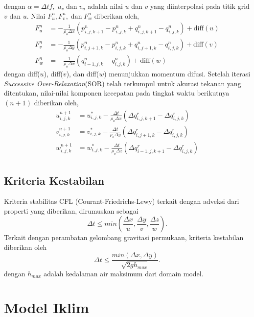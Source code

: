 \begin{spacing}{1.5}
\begin{equation}
	\end{equation}
	dengan $\alpha = \Delta tf, \; u_v \;\text{dan}\;v_u$ adalah nilai $u$ dan $v$ yang diinterpolasi pada titik grid $v$ dan $u$. Nilai $F_{u}^{n}, F_{v}^{n},\;\text{dan}\;F_{w}^{n}$ diberikan oleh,
	\begin{equation}
		\begin{aligned}
			F_{u}^{n} &=-\frac{1}{\rho_o \Delta x}(p_{i,j,k+1}^{n}-p_{i,j,k}^{n}+q_{i,j,k+1}^{n}-q_{i,j,k}^{n})+\text{diff}(u)\\
			F_{v}^{n} &=-\frac{1}{\rho_o \Delta y}(p_{i,j+1,k}^{n}-p_{i,j,k}^{n}+q_{i,j+1,k}^{n}-q_{i,j,k}^{n})+\text{diff}(v)\\
			F_{w}^{n} &=-\frac{1}{\rho_o \Delta x}(q_{i-1,j,k}^{n}-q_{i,j,k}^{n})+\text{diff}(w)
		\end{aligned}
	\end{equation}
	dengan diff($u$), diff($v$), dan diff($w$) menunjukkan momentum difusi. Setelah iterasi \textit{Successive Over-Relaxation}(SOR) telah terkumpul untuk akurasi tekanan yang ditentukan, nilai-nilai komponen kecepatan pada tingkat waktu berikutnya $(n+1)$ diberikan oleh,
	\begin{equation}
		\begin{aligned}
			u_{i,j,k}^{n+1} &= u_{i,j,k}^{*}-\frac{\Delta t}{\rho_o \Delta x}(\Delta q_{i,j,k+1}^{r} - \Delta q_{i,j,k}^{r})\\
			v_{i,j,k}^{n+1} &= v_{i,j,k}^{*}-\frac{\Delta t}{\rho_o \Delta y}(\Delta q_{i,j+1,k}^{r} - \Delta q_{i,j,k}^{r})\\
			w_{i,j,k}^{n+1} &= w_{i,j,k}^{*}-\frac{\Delta t}{\rho_o \Delta z}(\Delta q_{i-1,j,k+1}^{r} - \Delta q_{i,j,k}^{r})\\
		\end{aligned}
	\end{equation}
\subsection[Kriteria Kestabilan]{Kriteria Kestabilan}
	Kriteria stabilitas CFL (Courant-Friedrichs-Lewy) terkait dengan adveksi dari properti yang diberikan, dirumuskan sebagai
	\begin{equation}
		\Delta t \leq min\left(\frac{\Delta x}{u},\frac{\Delta y}{v},\frac{\Delta z}{w}\right).
	\end{equation}
	Terkait dengan perambatan gelombang gravitasi permukaan, kriteria kestabilan diberikan oleh
	\begin{equation}
		\Delta t \leq \frac{min(\Delta x,\Delta y)}{\sqrt{2gh_{max}}}.
	\end{equation} 
	dengan $h_{max}$ adalah kedalaman air maksimum dari domain model.
\end{spacing}
\vspace{-0.1pc}
\section[Model Iklim]{Model Iklim}
\begin{spacing}{1.5}
\end{spacing}
	
